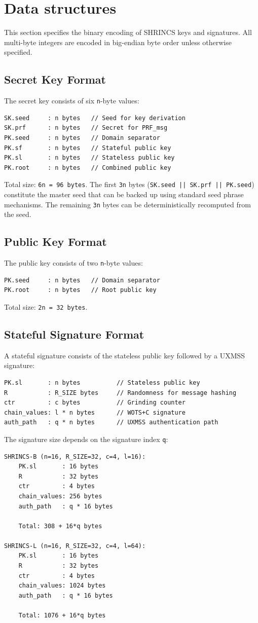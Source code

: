 \section{Data structures}

This section specifies the binary encoding of SHRINCS keys and signatures. All multi-byte integers are encoded in big-endian byte order unless otherwise specified.

\subsection{Secret Key Format}
The secret key consists of six \texttt{n}-byte values:
\begin{verbatim}
SK.seed     : n bytes   // Seed for key derivation
SK.prf      : n bytes   // Secret for PRF_msg
PK.seed     : n bytes   // Domain separator
PK.sf       : n bytes   // Stateful public key
PK.sl       : n bytes   // Stateless public key  
PK.root     : n bytes   // Combined public key
\end{verbatim}
Total size: \texttt{6n = 96 bytes}. The first \texttt{3n} bytes (\texttt{SK.seed || SK.prf || PK.seed}) constitute the master seed that can be backed up using standard seed phrase mechanisms. The remaining \texttt{3n} bytes can be deterministically recomputed from the seed.

\subsection{Public Key Format}
The public key consists of two \texttt{n}-byte values:
\begin{verbatim}
PK.seed     : n bytes   // Domain separator
PK.root     : n bytes   // Root public key
\end{verbatim}
Total size: \texttt{2n = 32 bytes}.

\subsection{Stateful Signature Format}
A stateful signature consists of the stateless public key followed by a UXMSS signature:
\begin{verbatim}
PK.sl       : n bytes          // Stateless public key
R           : R_SIZE bytes     // Randomness for message hashing  
ctr         : c bytes          // Grinding counter
chain_values: l * n bytes      // WOTS+C signature
auth_path   : q * n bytes      // UXMSS authentication path
\end{verbatim}
The signature size depends on the signature index \texttt{q}:
\begin{verbatim}
SHRINCS-B (n=16, R_SIZE=32, c=4, l=16):
    PK.sl       : 16 bytes
    R           : 32 bytes
    ctr         : 4 bytes
    chain_values: 256 bytes  
    auth_path   : q * 16 bytes
  
    Total: 308 + 16*q bytes

SHRINCS-L (n=16, R_SIZE=32, c=4, l=64):
    PK.sl       : 16 bytes
    R           : 32 bytes  
    ctr         : 4 bytes
    chain_values: 1024 bytes   
    auth_path   : q * 16 bytes
  
    Total: 1076 + 16*q bytes
\end{verbatim}

